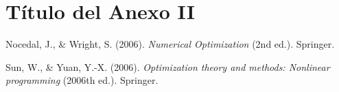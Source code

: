 \documentclass[11pt,a4paper]{book}
\theoremstyle{definition}
\theoremstyle{remark}
\begin{document}
\chapter{Título del Anexo II}

\backmatter

\begin{thebibliography}{99}

%


 Nocedal, J., \& Wright, S. (2006). \emph{Numerical Optimization} (2nd ed.). Springer.

 Sun, W., \& Yuan, Y.-X. (2006). \emph{Optimization theory and methods: Nonlinear programming} (2006th ed.). Springer.

%
\end{thebibliography}
\end{document}

